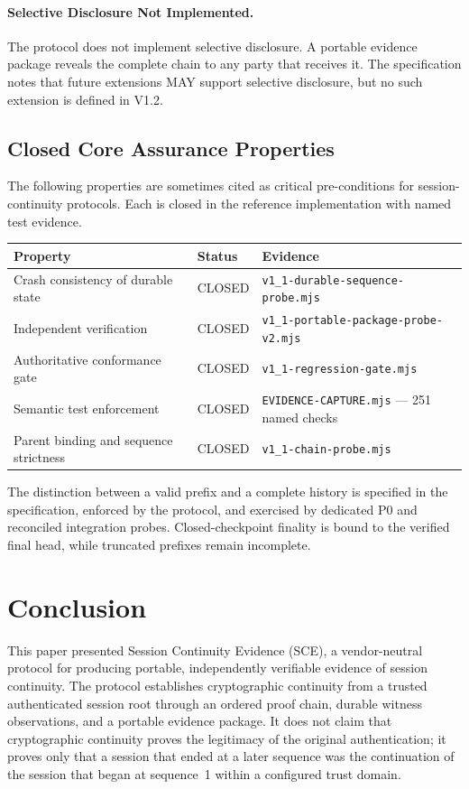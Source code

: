 \documentclass[11pt,a4paper]{article}
\begin{document}
\paragraph{Selective Disclosure Not Implemented.} The protocol does not implement selective disclosure. A portable evidence package reveals the complete chain to any party that receives it. The specification notes that future extensions MAY support selective disclosure, but no such extension is defined in V1.2.

\subsection{Closed Core Assurance Properties}

The following properties are sometimes cited as critical pre-conditions for session-continuity protocols. Each is closed in the reference implementation with named test evidence.

\begin{table}[h]
\centering
\small
\begin{tabular}{@{}p{5.5cm}p{2cm}p{7cm}@{}}
\toprule
Property & Status & Evidence \\
\midrule
Crash consistency of durable state & CLOSED & \texttt{v1\_1-durable-sequence-probe.mjs} \\
Independent verification & CLOSED & \texttt{v1\_1-portable-package-probe-v2.mjs} \\
Authoritative conformance gate & CLOSED & \texttt{v1\_1-regression-gate.mjs} \\
Semantic test enforcement & CLOSED & \texttt{EVIDENCE-CAPTURE.mjs} --- 251 named checks \\
Parent binding and sequence strictness & CLOSED & \texttt{v1\_1-chain-probe.mjs} \\
\bottomrule
\end{tabular}
\end{table}

The distinction between a valid prefix and a complete history is specified in the specification, enforced by the protocol, and exercised by dedicated P0 and reconciled integration probes. Closed-checkpoint finality is bound to the verified final head, while truncated prefixes remain incomplete.

\section{Conclusion}

This paper presented Session Continuity Evidence (SCE), a vendor-neutral protocol for producing portable, independently verifiable evidence of session continuity. The protocol establishes cryptographic continuity from a trusted authenticated session root through an ordered proof chain, durable witness observations, and a portable evidence package. It does not claim that cryptographic continuity proves the legitimacy of the original authentication; it proves only that a session that ended at a later sequence was the continuation of the session that began at sequence~1 within a configured trust domain.
\end{document}
